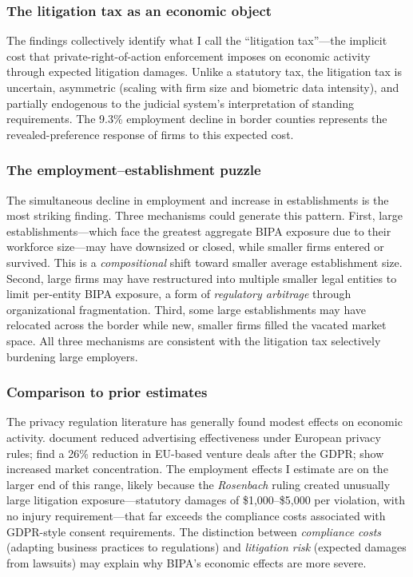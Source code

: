 \documentclass[12pt]{article}
\begin{document}
\subsubsection*{The litigation tax as an economic object} The findings collectively identify what I call the ``litigation tax''---the implicit cost that private-right-of-action enforcement imposes on economic activity through expected litigation damages. Unlike a statutory tax, the litigation tax is uncertain, asymmetric (scaling with firm size and biometric data intensity), and partially endogenous to the judicial system's interpretation of standing requirements. The 9.3\% employment decline in border counties represents the revealed-preference response of firms to this expected cost.

\subsubsection*{The employment--establishment puzzle} The simultaneous decline in employment and increase in establishments is the most striking finding. Three mechanisms could generate this pattern. First, large establishments---which face the greatest aggregate BIPA exposure due to their workforce size---may have downsized or closed, while smaller firms entered or survived. This is a \emph{compositional} shift toward smaller average establishment size. Second, large firms may have restructured into multiple smaller legal entities to limit per-entity BIPA exposure, a form of \emph{regulatory arbitrage} through organizational fragmentation. Third, some large establishments may have relocated across the border while new, smaller firms filled the vacated market space. All three mechanisms are consistent with the litigation tax selectively burdening large employers.

\subsubsection*{Comparison to prior estimates} The privacy regulation literature has generally found modest effects on economic activity. \citet{goldfarb2011} document reduced advertising effectiveness under European privacy rules; \citet{jia2021} find a 26\% reduction in EU-based venture deals after the GDPR; \citet{johnson2021} show increased market concentration. The employment effects I estimate are on the larger end of this range, likely because the \emph{Rosenbach} ruling created unusually large litigation exposure---statutory damages of \$1,000--\$5,000 per violation, with no injury requirement---that far exceeds the compliance costs associated with GDPR-style consent requirements. The distinction between \emph{compliance costs} (adapting business practices to regulations) and \emph{litigation risk} (expected damages from lawsuits) may explain why BIPA's economic effects are more severe.
\end{document}
